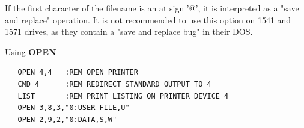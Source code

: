 \begin{description}[leftmargin=2cm,style=nextline]
   If the first character of the filename is an at sign '@', it
   is interpreted as a "save and replace" operation. It is not recommended
   to use this option on 1541 and 1571 drives, as they
   contain a "save and replace bug" in their DOS.

\item [Example:] Using {\bf OPEN}

\begin{tcolorbox}[colback=black,coltext=white]
\verbatimfont{\codefont}
\begin{verbatim}
   OPEN 4,4   :REM OPEN PRINTER
   CMD 4      :REM REDIRECT STANDARD OUTPUT TO 4
   LIST       :REM PRINT LISTING ON PRINTER DEVICE 4
   OPEN 3,8,3,"0:USER FILE,U"
   OPEN 2,9,2,"0:DATA,S,W"
\end{verbatim}
\end{tcolorbox}
\end{description}


\newpage
